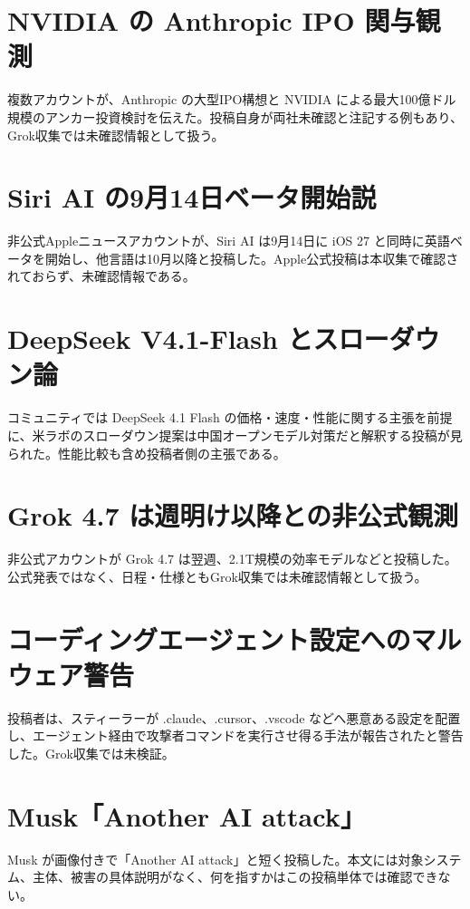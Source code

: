 \section{NVIDIA の Anthropic IPO 関与観測}
複数アカウントが、Anthropic の大型IPO構想と NVIDIA による最大100億ドル規模のアンカー投資検討を伝えた。投稿自身が両社未確認と注記する例もあり、Grok収集では未確認情報として扱う。

\section{Siri AI の9月14日ベータ開始説}
非公式Appleニュースアカウントが、Siri AI は9月14日に iOS 27 と同時に英語ベータを開始し、他言語は10月以降と投稿した。Apple公式投稿は本収集で確認されておらず、未確認情報である。

\section{DeepSeek V4.1-Flash とスローダウン論}
コミュニティでは DeepSeek 4.1 Flash の価格・速度・性能に関する主張を前提に、米ラボのスローダウン提案は中国オープンモデル対策だと解釈する投稿が見られた。性能比較も含め投稿者側の主張である。

\section{Grok 4.7 は週明け以降との非公式観測}
非公式アカウントが Grok 4.7 は翌週、2.1T規模の効率モデルなどと投稿した。公式発表ではなく、日程・仕様ともGrok収集では未確認情報として扱う。

\section{コーディングエージェント設定へのマルウェア警告}
投稿者は、スティーラーが .claude、.cursor、.vscode などへ悪意ある設定を配置し、エージェント経由で攻撃者コマンドを実行させ得る手法が報告されたと警告した。Grok収集では未検証。

\section{Musk「Another AI attack」}
Musk が画像付きで「Another AI attack」と短く投稿した。本文には対象システム、主体、被害の具体説明がなく、何を指すかはこの投稿単体では確認できない。

